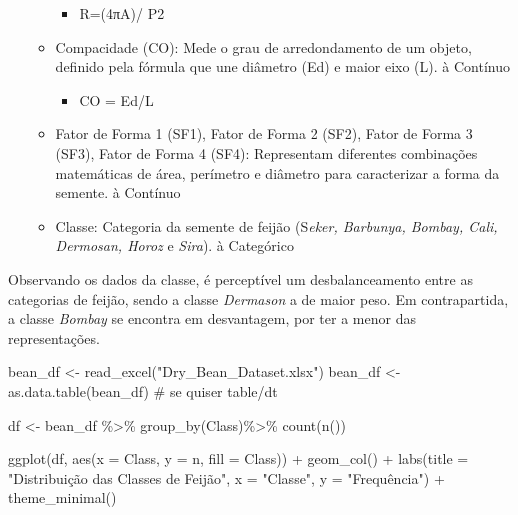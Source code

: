 \documentclass[
  letterpaper,
  DIV=11,
  numbers=noendperiod]{scrartcl}
\newenvironment{Shaded}{\begin{snugshade}}{\end{snugshade}}
\newcommand{\AttributeTok}[1]{\textcolor[rgb]{0.40,0.45,0.13}{#1}}
\newcommand{\CommentTok}[1]{\textcolor[rgb]{0.37,0.37,0.37}{#1}}
\newcommand{\FunctionTok}[1]{\textcolor[rgb]{0.28,0.35,0.67}{#1}}
\newcommand{\NormalTok}[1]{\textcolor[rgb]{0.00,0.23,0.31}{#1}}
\newcommand{\OtherTok}[1]{\textcolor[rgb]{0.00,0.23,0.31}{#1}}
\newcommand{\SpecialCharTok}[1]{\textcolor[rgb]{0.37,0.37,0.37}{#1}}
\newcommand{\StringTok}[1]{\textcolor[rgb]{0.13,0.47,0.30}{#1}}
\providecommand{\tightlist}{%
  \setlength{\itemsep}{0pt}\setlength{\parskip}{0pt}}\usepackage{longtable,booktabs,array}
\begin{document}
\begin{itemize}
\begin{itemize}
    \begin{itemize}
    \tightlist
    \item
      R=(4πA)/ P2
    \end{itemize}
  \item
    Compacidade (CO): Mede o grau de arredondamento de um objeto,
    definido pela fórmula que une diâmetro (Ed) e maior eixo (L). à
    Contínuo

    \begin{itemize}
    \tightlist
    \item
      CO = Ed/L
    \end{itemize}
  \item
    Fator de Forma 1 (SF1), Fator de Forma 2 (SF2), Fator de Forma 3
    (SF3), Fator de Forma 4 (SF4): Representam diferentes combinações
    matemáticas de área, perímetro e diâmetro para caracterizar a forma
    da semente. à Contínuo~
  \item
    Classe: Categoria da semente de feijão (S\emph{eker, Barbunya,
    Bombay, Cali, Dermosan, Horoz} e \emph{Sira}). à Categórico
  \end{itemize}
\end{itemize}

Observando os dados da classe, é perceptível um desbalanceamento entre
as categorias de feijão, sendo a classe \emph{Dermason} a de maior peso.
Em contrapartida, a classe \emph{Bombay} se encontra em desvantagem, por
ter a menor das representações.

\begin{Shaded}
\begin{Highlighting}[]
\NormalTok{bean\_df }\OtherTok{\textless{}{-}} \FunctionTok{read\_excel}\NormalTok{(}\StringTok{"Dry\_Bean\_Dataset.xlsx"}\NormalTok{)}
\NormalTok{bean\_df }\OtherTok{\textless{}{-}} \FunctionTok{as.data.table}\NormalTok{(bean\_df)   }\CommentTok{\# se quiser table/dt}

\NormalTok{df }\OtherTok{\textless{}{-}}\NormalTok{ bean\_df }\SpecialCharTok{\%\textgreater{}\%} 
  \FunctionTok{group\_by}\NormalTok{(Class)}\SpecialCharTok{\%\textgreater{}\%} 
  \FunctionTok{count}\NormalTok{(}\FunctionTok{n}\NormalTok{())}

\FunctionTok{ggplot}\NormalTok{(df, }\FunctionTok{aes}\NormalTok{(}\AttributeTok{x =}\NormalTok{ Class, }\AttributeTok{y =}\NormalTok{ n, }\AttributeTok{fill =}\NormalTok{ Class)) }\SpecialCharTok{+}
  \FunctionTok{geom\_col}\NormalTok{() }\SpecialCharTok{+}
  \FunctionTok{labs}\NormalTok{(}\AttributeTok{title =} \StringTok{"Distribuição das Classes de Feijão"}\NormalTok{,}
       \AttributeTok{x =} \StringTok{"Classe"}\NormalTok{,}
       \AttributeTok{y =} \StringTok{"Frequência"}\NormalTok{) }\SpecialCharTok{+}
  \FunctionTok{theme\_minimal}\NormalTok{()}
\end{Highlighting}
\end{Shaded}
\end{document}
